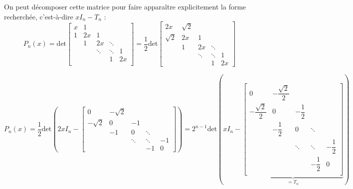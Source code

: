 On peut décomposer cette matrice pour faire apparaître explicitement la forme recherchée, c'est-à-dire $xI_n - T_n$ :
$$P_n(x) = \text{det}
\left[ 
\begin{array}{ccccc}
x & 1 & & &  \\
1 & 2x & 1 & & \\
 & 1 & 2x & \ddots & \\
 & & \ddots & \ddots & 1  \\
 & & & 1 & 2x   \\
\end{array}
\right] = \frac{1}{2 }\text{det}
\left[ 
\begin{array}{cccccc}
2x & \sqrt{2} & & & \\
\sqrt{2} & 2x & 1 & & \\
 & 1 & 2x & \ddots & \\
 & & \ddots & \ddots & 1 \\
 & & & 1 & 2x  
\end{array}
\right]$$
 
$$P_n(x) = \frac{1}{2} \text{det} \left( 2x I_n - \left[ 
\begin{array}{cccccc}
0 & -\sqrt{2} & & &  \\
-\sqrt{2} & 0 & -1 & & \\
 & -1 & 0 & \ddots & \\
 & & \ddots & \ddots  &  -1\\
 & & & -1 & 0
\end{array}
\right] \right) = 2^{n-1} \text{det} \left( x I_n - \underbrace{\left[ 
\begin{array}{ccccc}
0 & - \dfrac{\sqrt{2}}{2} & & &  \\
- \dfrac{\sqrt{2}}{2} & 0 & -\dfrac{1}{2} & & \\
 & -\dfrac{1}{2} & 0 & \ddots &  \\
 & & \ddots & \ddots & -\dfrac{1}{2} \\
 & & & -\dfrac{1}{2} & 0 \\
\end{array}
\right]}_{=T_n}  \right)
$$


